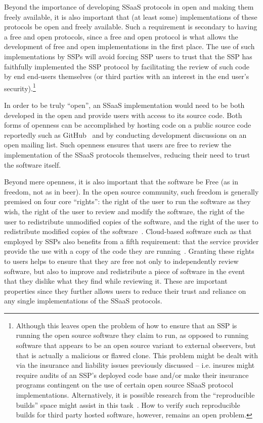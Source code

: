 Beyond the importance of developing SSaaS protocols in open and making
them freely available, it is also important that (at least some)
implementations of these protocols be open and freely available. Such
a requirement is secondary to having a free and open protocols, since
a free and open protocol is what allows the development of free and
open implementations in the first place. The use of such
implementations by SSPs will avoid forcing SSP users to trust that the
SSP has faithfully implemented the SSP protocol by facilitating the
review of such code by end end-users themselves (or third parties with
an interest in the end user's security).\footnote{Although this leaves
  open the problem of how to ensure that an SSP is running the open
  source software they claim to run, as opposed to running software
  that appears to be an open source variant to external observers, but
  that is actually a malicious or flawed clone. This problem might be
  dealt with via the insurance and liability issues previously
  discussed -- i.e. insures might require audits of an SSP's deployed
  code base and/or make their insurance programs contingent on the use
  of certain open source SSaaS protocol
  implementations. Alternatively, it is possible research from the
  ``reproducible builds'' space might assist in this
  task~\cite{DeCarnedeCarnavalet2014}. How to verify such reproducible
  builds for third party hosted software, however, remains an open
  problem.}

In order to be truly ``open'', an SSaaS implementation would need to
be both developed in the open and provide users with access to its
source code. Both forms of openness can be accomplished by hosting
code on a public source code reportedly such as GitHub~\cite{github}
and by conducting development discussions on an open mailing
list. Such openness ensures that users are free to review the
implementation of the SSaaS protocols themselves, reducing their need
to trust the software itself.

Beyond mere openness, it is also important that the software be Free
(as in freedom, not as in beer). In the open source community, such
freedom is generally premised on four core ``rights'': the right of
the user to run the software as they wish, the right of the user to
review and modify the software, the right of the user to redistribute
unmodified copies of the software, and the right of the user to
redistribute modified copies of the
software~\cite{fsf-freedoms}. Cloud-based software such as that
employed by SSPs also benefits from a fifth requirement: that the
service provider provide the use with a copy of the code they are
running~\cite{agpl}. Granting these rights to users helps to ensure
that they are free not only to independently review software, but also
to improve and redistribute a piece of software in the event that they
dislike what they find while reviewing it. These are important
properties since they further allows users to reduce their trust and
reliance on any single implementations of the SSaaS protocols.

